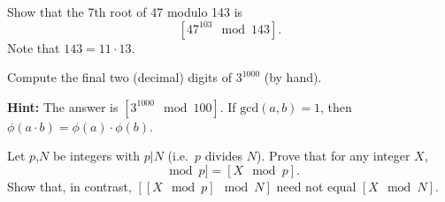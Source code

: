 \documentclass[a4paper,10pt,landscape,twocolumn]{scrartcl}
\begin{document}
\problems

\begin{exercise}
\begin{subex}
Show that the 7th root of 47 modulo 143 is $$[47^{103} \mod 143].$$ Note that $143=11\cdot 13$.
\end{subex}

\begin{subex}
Compute the final two (decimal) digits of $3^{1000}$ (by hand).

\textbf{Hint:} The answer is $[3^{1000} \mod 100]$. If $\text{gcd}(a,b)=1$, then $\phi(a\cdot b)=\phi(a)\cdot\phi(b)$.
\end{subex}

\begin{subex}
Let $p$,$N$ be integers with $p|N$ (i.e.\ $p$ divides $N$). Prove that for any integer $X$,
\begin{equation*}
[[X \mod N]\mod p]=[X \mod p].
\end{equation*}
Show that, in contrast, $[[X \mod p]\mod N]$ need not equal $[X\mod N]$.
\end{subex}

\end{exercise}


%

\end{document}
